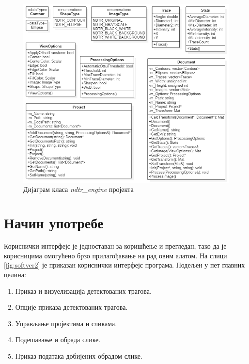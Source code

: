 \documentclass[11pt,a4paper,serbian,oneside]{book}
\begin{document}
\begin{figure}[H]
\begin{center}
\includegraphics[width=150mm]{images/engine.png}
\end{center}
\caption{Дијаграм класа \textit{ndtr\_engine} пројекта}
\label{fig:engine}
\end{figure}

\section{Начин употребе}

Кориснички интерфејс је једноставан за коришћење и прегледан, тако да је корисницима омогућено брзо прилагођавање на рад овим алатом. На слици \ref{fig:softver2} је приказан кориснички интерфејс програма. Подељен у пет главних целина:
\begin{enumerate}
  \item Приказ и визуелизација детектованих трагова.
  \item Опције приказа детектованих трагова.
  \item Управљање пројектима и сликама.
  \item Подешавање и обрада слике.
  \item Приказ података добијених обрадом слике.
\end{enumerate}
\end{document}
